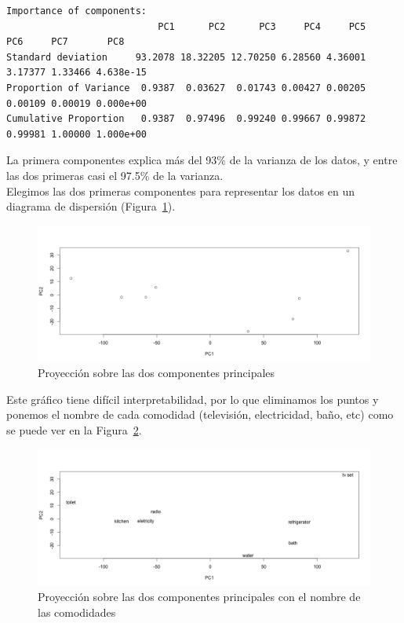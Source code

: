 \documentclass[12pt,a4paper,twoside,openright,titlepage,final]{article}
\begin{document}
\begin{Verbatim}[fontsize=\scriptsize]
Importance of components:
                           PC1      PC2      PC3     PC4     PC5     PC6     PC7       PC8
Standard deviation     93.2078 18.32205 12.70250 6.28560 4.36001 3.17377 1.33466 4.638e-15
Proportion of Variance  0.9387  0.03627  0.01743 0.00427 0.00205 0.00109 0.00019 0.000e+00
Cumulative Proportion   0.9387  0.97496  0.99240 0.99667 0.99872 0.99981 1.00000 1.000e+00
\end{Verbatim}

La primera componentes explica más del 93\% de la varianza de los datos, y entre las dos primeras casi el 97.5\% de la varianza.\\

Elegimos las dos primeras componentes para representar los datos en un diagrama de dispersión (Figura~\ref{fig:dos_componentes}).\\

\begin{figure}[tbph!]
\centering
\includegraphics[width=0.8\linewidth]{imagenes/dos_componentes}
\caption{Proyección sobre las dos componentes principales}
\label{fig:dos_componentes}
\end{figure}

Este gráfico tiene difícil interpretabilidad, por lo que eliminamos los puntos y ponemos el nombre de cada comodidad (televisión, electricidad, baño, etc) como se puede ver en la Figura~\ref{fig:dos_componentes_nombres}.\\

\begin{figure}[tbph!]
\centering
\includegraphics[width=0.8\linewidth]{imagenes/dos_componentes_nombres}
\caption{Proyección sobre las dos componentes principales con el nombre de las comodidades}
\label{fig:dos_componentes_nombres}
\end{figure}
\end{document}
